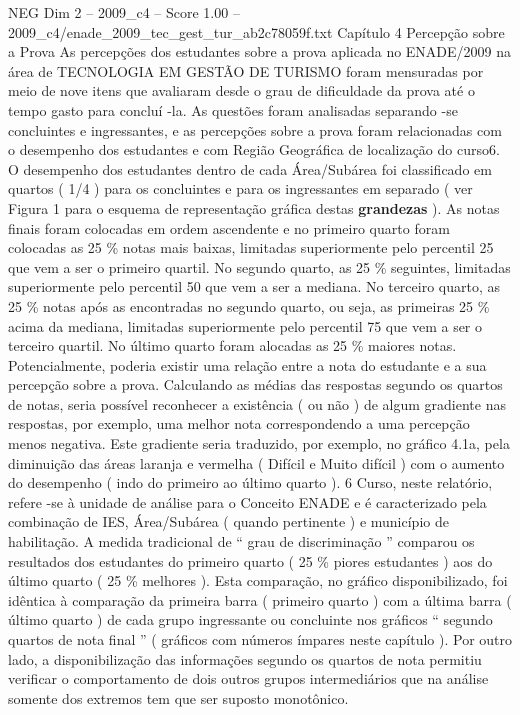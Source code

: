 \begin{textsample}{NEG Dim 2 – 2009\_c4 – Score 1.00 – 2009\_c4/enade\_2009\_tec\_gest\_tur\_ab2c78059f.txt}  \label{ex:f2_neg_232}
Capítulo 4 Percepção sobre a Prova As percepções dos estudantes sobre a prova aplicada no ENADE/2009 na área de TECNOLOGIA EM GESTÃO DE TURISMO foram mensuradas por meio de nove itens que avaliaram desde o grau de dificuldade da prova até o tempo gasto para concluí -la.
As questões foram analisadas separando -se concluintes e ingressantes, e as percepções sobre a prova foram relacionadas com o desempenho dos estudantes e com Região Geográfica de localização do curso6.
O desempenho dos estudantes dentro de cada Área/Subárea foi classificado em quartos ( 1/4 ) para os concluintes e para os ingressantes em separado ( ver Figura 1 para o esquema de representação gráfica destas \textbf{grandezas} ).
As notas finais foram colocadas em ordem ascendente e no primeiro quarto foram colocadas as 25 \% notas mais baixas, limitadas superiormente pelo percentil 25 que vem a ser o primeiro quartil.
No segundo quarto, as 25 \% seguintes, limitadas superiormente pelo percentil 50 que vem a ser a mediana.
No terceiro quarto, as 25 \% notas após as encontradas no segundo quarto, ou seja, as primeiras 25 \% acima da mediana, limitadas superiormente pelo percentil 75 que vem a ser o terceiro quartil.
No último quarto foram alocadas as 25 \% maiores notas.
Potencialmente, poderia existir uma relação entre a nota do estudante e a sua percepção sobre a prova.
Calculando as médias das respostas segundo os quartos de notas, seria possível reconhecer a existência ( ou não ) de algum gradiente nas respostas, por exemplo, uma melhor nota correspondendo a uma percepção menos negativa.
Este gradiente seria traduzido, por exemplo, no gráfico 4.1a, pela diminuição das áreas laranja e vermelha ( Difícil e Muito difícil ) com o aumento do desempenho ( indo do primeiro ao último quarto ). 6 Curso, neste relatório, refere -se à unidade de análise para o Conceito ENADE e é caracterizado pela combinação de IES, Área/Subárea ( quando pertinente ) e município de habilitação.
A medida tradicional de “ grau de discriminação ” comparou os resultados dos estudantes do primeiro quarto ( 25 \% piores estudantes ) aos do último quarto ( 25 \% melhores ).
Esta comparação, no gráfico disponibilizado, foi idêntica à comparação da primeira barra ( primeiro quarto ) com a última barra ( último quarto ) de cada grupo ingressante ou concluinte nos gráficos “ segundo quartos de nota final ” ( gráficos com números ímpares neste capítulo ).
Por outro lado, a disponibilização das informações segundo os quartos de nota permitiu verificar o comportamento de dois outros grupos intermediários que na análise somente dos extremos tem que ser suposto monotônico.

\end{textsample}
